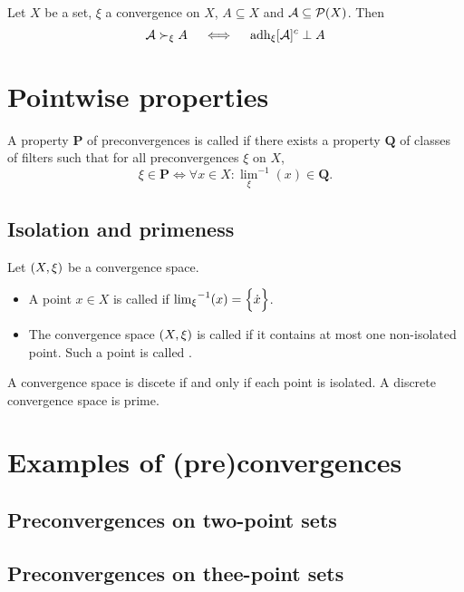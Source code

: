\begin{proposition}
Let $X$ be a set, $\xi$ a convergence on $X$, $A\subseteq X$ and $\mathcal{A}\subseteq \operatorname{\mathcal{P}}(X)$. Then
\[ \mathcal{A} \succ_\xi A \quad\iff\quad \operatorname{adh}_\xi [\mathcal{A}]^c \perp A \]
\end{proposition}


\section{Pointwise properties}
\begin{definition}
A property $\mathbf{P}$ of preconvergences is called  if there exists a property $\mathbf{Q}$ of classes of filters such that for all preconvergences $\xi$ on $X$,
\[ \xi \in \mathbf{P} \iff \forall x\in X: {\lim_\xi}^{-1}(x) \in \mathbf{Q}. \]
\end{definition}

\subsection{Isolation and primeness}
\begin{definition}
Let $\left( X,\xi \right)$ be a convergence space.
\begin{itemize}
\item A point $x\in X$ is called  if ${\lim_\xi}^{-1}(x) = \Big\{ \dot{x} \Big\}$.
\item The convergence space $\left( X,\xi \right)$ is called  if it contains at most one non-isolated point. Such a point is called .
\end{itemize}
\end{definition}

A convergence space is discete if and only if each point is isolated. A discrete convergence space is prime.


\section{Examples of (pre)convergences}
\subsection{Preconvergences on two-point sets}
\subsection{Preconvergences on thee-point sets}

